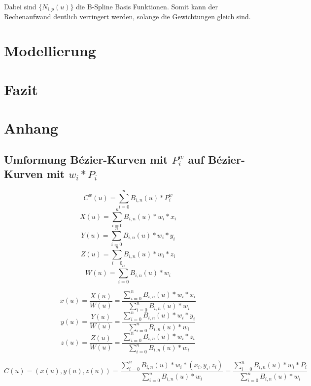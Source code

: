 \documentclass[11pt]{article}
\begin{document}
Dabei sind $\{N_{i,p}(u)\}$ die B-Spline Basis Funktionen. 
Somit kann der Rechenaufwand deutlich verringert werden, solange die Gewichtungen gleich sind.



\section{Modellierung}
\label{sec:modellierung}

\section{Fazit}
\label{sec:fazit}
\section{Anhang}
\subsection{Umformung Bézier-Kurven mit $P_{i}^{w}$ auf Bézier-Kurven mit $w_{i}*P_{i}$}
\[C^{w}(u) = \sum_{i=0}^{n} B_{i,n} (u) * P^{w}_{i}\]
\[X(u) = \sum_{i=0}^{n} B_{i,n} (u) * w_{i} * x_{i}\]
\[Y(u) = \sum_{i=0}^{n} B_{i,n} (u) * w_{i} * y_{i}\]
\[Z(u) = \sum_{i=0}^{n} B_{i,n} (u) * w_{i} * z_{i}\]
\[W(u) = \sum_{i=0}^{n} B_{i,n} (u) * w_{i}\]

\[x(u) = \frac{X(u)}{W(u)} = \frac{\sum_{i=0}^{n} B_{i,n} (u) * w_{i} * x_{i}}{ \sum_{i=0}^{n} B_{i,n} (u) * w_{i}}\] 
\[y(u) = \frac{Y(u)}{W(u)} = \frac{\sum_{i=0}^{n} B_{i,n} (u) * w_{i} * y_{i}}{ \sum_{i=0}^{n} B_{i,n} (u) * w_{i}}\] 
\[z(u) = \frac{Z(u)}{W(u)} = \frac{\sum_{i=0}^{n} B_{i,n} (u) * w_{i} * z_{i}}{ \sum_{i=0}^{n} B_{i,n} (u) * w_{i}}\] 

\[C(u) = (x(u), y(u), z(u)) = \frac{\sum_{i=0}^{n} B_{i,n}(u) * w_{i} * (x_{i}, y_{i}, z_{i})}{\sum_{i=0}^{n} B_{i,n}(u) * w_{i}} =  \frac{\sum_{i=0}^{n} B_{i,n}(u) * w_{i} * P_{i}}{\sum_{i=0}^{n} B_{i,n}(u) * w_{i}}\]
\end{document}
